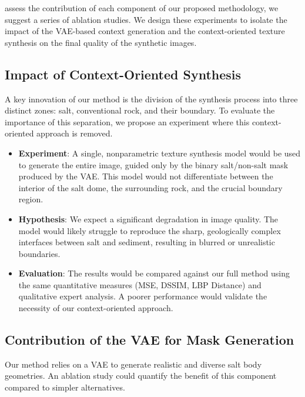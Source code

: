 \documentclass{ieeeaccess}
\begin{document}
 assess the contribution of each component of our proposed methodology, we suggest a series of ablation studies. We design these experiments to isolate the impact of the VAE-based context generation and the context-oriented texture synthesis on the final quality of the synthetic images.

\subsection{Impact of Context-Oriented Synthesis}

A key innovation of our method is the division of the synthesis process into three distinct zones: salt, conventional rock, and their boundary. To evaluate the importance of this separation, we propose an experiment where this context-oriented approach is removed.

\begin{itemize}
    \item \textbf{Experiment}: A single, nonparametric texture synthesis model would be used to generate the entire image, guided only by the binary salt/non-salt mask produced by the VAE. This model would not differentiate between the interior of the salt dome, the surrounding rock, and the crucial boundary region.
    \item \textbf{Hypothesis}: We expect a significant degradation in image quality. The model would likely struggle to reproduce the sharp, geologically complex interfaces between salt and sediment, resulting in blurred or unrealistic boundaries.
    \item \textbf{Evaluation}: The results would be compared against our full method using the same quantitative measures (MSE, DSSIM, LBP Distance) and qualitative expert analysis. A poorer performance would validate the necessity of our context-oriented approach.
\end{itemize}

\subsection{Contribution of the VAE for Mask Generation}

Our method relies on a VAE to generate realistic and diverse salt body geometries. An ablation study could quantify the benefit of this component compared to simpler alternatives.
\end{document}
